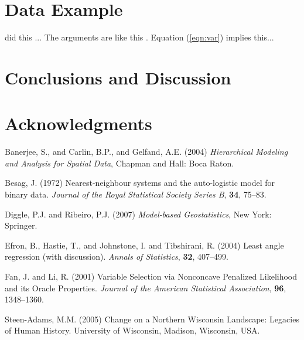 \documentclass[authoryear,review, 11pt]{elsarticle}
\begin{document}
\section{Data Example}
\label{sec:data}

\cite{banerjeec04} did this ... The arguments are like this \citep{banerjeec04}.  Equation (\ref{eqn:var}) implies this...

\section{Conclusions and Discussion}
\label{sec:disc}

\section*{Acknowledgments}

\begin{thebibliography}{00}

 Banerjee, S., and Carlin, B.P., and Gelfand, A.E. (2004)  \textit{Hierarchical Modeling and Analysis for Spatial Data}, Chapman and Hall: Boca Raton.

 Besag, J. (1972) Nearest-neighbour systems and the auto-logistic model for binary data. \textit{Journal of the Royal Statistical Society Series B}, \textbf{34}, 75--83.

 Diggle, P.J. and Ribeiro, P.J. (2007) \textit{Model-based Geostatistics}, New York: Springer.

 Efron, B., Hastie, T., and Johnstone, I. and Tibshirani, R. (2004) Least angle regression (with discussion). \textit{Annals of Statistics}, \textbf{32}, 407--499.

 Fan, J. and Li, R. (2001) Variable Selection via Nonconcave Penalized Likelihood and its Oracle Properties. \textit{Journal of the American Statistical Association}, \textbf{96}, 1348--1360.

 Steen-Adams, M.M. (2005) Change on a Northern Wisconsin Landscape: Legacies of Human History. University of Wisconsin, Madison, Wisconsin, USA.

\end{thebibliography}
\end{document}

